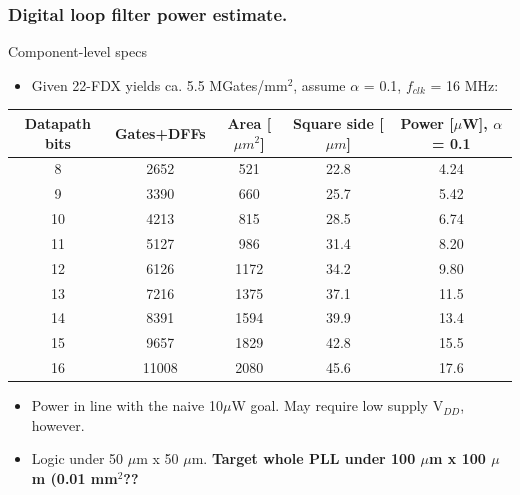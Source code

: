 \documentclass[t, screen, aspectratio=43]{beamer}
\begin{document}
\begin{frame}
	\frametitle{Digital loop filter power estimate.}
	\begin{block}{Component-level specs}
		\scriptsize
		\begin{itemize}[itemsep=4pt,label=\protect---]
			\scriptsize
			\item Given 22-FDX yields ca. 5.5 MGates/mm$^2$, assume $\alpha$ = 0.1, $f_{clk}$ = 16 MHz:
		\end{itemize} 
	\vspace{-1em}
	\begin{table}[h!]
		\centering
		\def\arraystretch{1.5}		
		\setlength\arrayrulewidth{0.75pt}
		\setlength{\tabcolsep}{1em} %
		\tiny
		\begin{tabular}{|c|c|c|c|c|}
			\hline 
			\rule[-1ex]{0pt}{2.5ex} \cellcolor{gray!40}\textbf{Datapath bits} & \cellcolor{gray!40}\textbf{Gates+DFFs} & \cellcolor{gray!40}\textbf{Area} [$\mu m^2$] & \cellcolor{gray!40}\textbf{Square side [$\mu m$]} &  \cellcolor{gray!40}\textbf{Power} [$\mu$W], $\alpha$ = 0.1\\ 
			\hline 
			\rule[-1ex]{0pt}{2.5ex} 8 & 2652 & 521 & 22.8 & 4.24 \\ 
			\hline 
			\rule[-1ex]{0pt}{2.5ex} 9 & 3390 & 660 & 25.7 & 5.42 \\ 
			\hline 
			\rule[-1ex]{0pt}{2.5ex} 10 & 4213 & 815 & 28.5 & 6.74 \\ 
			\hline 
			\rule[-1ex]{0pt}{2.5ex} 11 & 5127 & 986 & 31.4 & 8.20 \\ 
			\hline 
			\rule[-1ex]{0pt}{2.5ex} 12 & 6126 & 1172 & 34.2 & 9.80 \\ 
			\hline 
			\rule[-1ex]{0pt}{2.5ex} 13 & 7216 & 1375 & 37.1 & 11.5 \\ 
			\hline 
			\rule[-1ex]{0pt}{2.5ex} 14 & 8391 & 1594& 39.9 & 13.4 \\ 
			\hline 
			\rule[-1ex]{0pt}{2.5ex} 15 & 9657 & 1829 & 42.8 & 15.5 \\ 
			\hline 
			\rule[-1ex]{0pt}{2.5ex} 16 & 11008 & 2080 & 45.6 & 17.6 \\ 
			\hline 
		\end{tabular} 
		\label{design_specs}
	\end{table}   
		\scriptsize
		\vspace{-1em}
		\begin{itemize}[itemsep=4pt,label=\protect---]
			\scriptsize
			\item Power in line with the naive 10$\mu$W goal. May require low supply V$_{DD}$, however.
			\item Logic under 50 $\mu$m x 50 $\mu$m. \textbf{Target whole PLL under 100 $\mu$m x 100 $\mu$m (0.01 mm$^2$??}
		\end{itemize} 
	\end{block}    
\end{frame}
\end{document}
